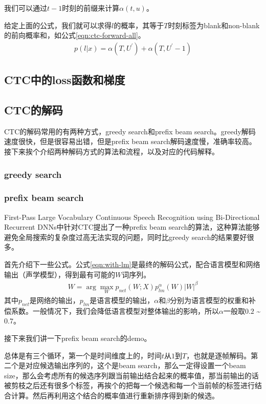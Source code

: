 我们可以通过$t-1$时刻的前缀来计算$\alpha(t,u)$。

给定上面的公式，我们就可以求得$l$的概率，其等于$T$时刻标签为blank和non-blank的前向概率和，如公式\ref{eqn:ctc-forward-all}。
\begin{align}
\label{eqn:ctc-forward-all}
  p(l|x) = \alpha(T, U^{'}) + \alpha(T, U^{'}-1) 
\end{align}

\subsection{CTC中的loss函数和梯度}

\subsection{CTC的解码}
CTC的解码常用的有两种方式，greedy search和prefix beam search。greedy解码速度很快，但是很容易出错，但是prefix beam search解码速度慢，准确率较高。接下来挨个介绍两种解码方式的算法和流程，以及对应的代码解释。

\subsubsection{greedy search}


\subsubsection{prefix beam search}
First-Pass Large Vocabulary Continuous Speech Recognition using Bi-Directional Recurrent DNNs中针对CTC提出了一种prefix beam search的算法，这种算法能够避免全局搜索的复杂度过高无法实现的问题，同时比greedy search的结果要好很多。

首先介绍下一些公式。公式\ref{eqn:with-lm}是最终的解码公式，配合语言模型和网络输出（声学模型），得到最有可能的$W$词序列。
\begin{align}
\label{eqn:with-lm}
W = \arg\mathop{\max}_{W}p_{net}(W;X)p_{lm}^{\alpha}(W)|W|^{\beta}
\end{align}
其中$p_{net}$是网络的输出，$p_{lm}$是语言模型的输出，$\alpha$和$\beta$分别为语言模型的权重和补偿系数。一般情况下，我们会降低语言模型对整体输出的影响，所以$\alpha$一般取$0.2$ \~ $0.7$。

接下来我们讲一下prefix beam search的demo。

总体是有三个循环，第一个是时间维度上的，时间$t$从$1$到$T$，也就是逐帧解码。第二个是对应候选输出序列的，这个是beam search，那么一定得设置一个beam size，那么会考虑所有的候选序列跟当前输出结合起来的概率值，那当前输出的话被剪枝之后还有很多个标签，再挨个的把每一个候选和每一个当前帧的标签进行结合计算。然后再利用这个结合的概率值进行重新排序得到新的候选。

